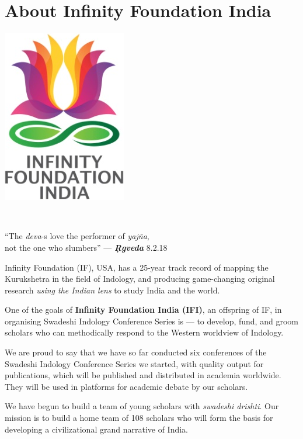 
\chapter*{About Infinity Foundation India}\label{about}

\vspace{-1cm}

\begin{center}
\includegraphics[scale=0.23]{images/logo.png}
\end{center}

\begin{center}
\\ 
\end{center}

\begin{center}
“The \textit{deva}-s love the performer of \textit{yajña},\\ not the one who slumbers” — \textbf{\textit{Ṛgveda}} 8.2.18
\end{center}

Infinity Foundation (IF), USA, has a 25-year track record of mapping the Kurukshetra in the field of Indology, and producing game-changing original research \textit{using the Indian lens} to study India and the world.

One of the goals of \textbf{Infinity Foundation India (IFI)}, an offspring of IF, in organising Swadeshi Indology Conference Series is — to develop, fund, and groom scholars who can methodically respond to the Western worldview of Indology.

We are proud to say that we have so far conducted six conferences of the Swadeshi Indology Conference Series we started, with quality output for publications, which will be published and distributed in academia worldwide. They will be used in platforms for academic debate by our scholars.

We have begun to build a team of young scholars with \textit{swadeshi drishti}. Our mission is to build a home team of 108 scholars who will form the basis for developing a civilizational grand narrative of India.

